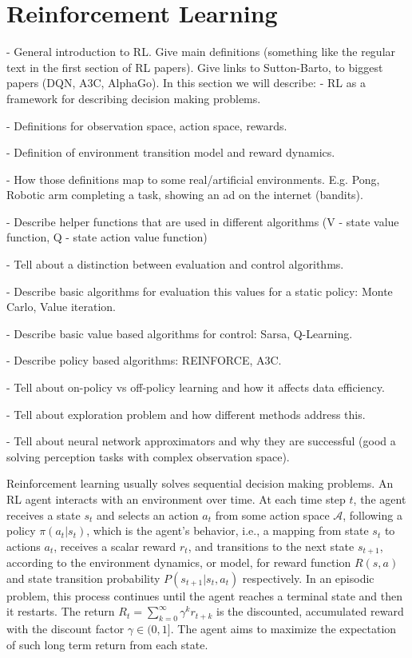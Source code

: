\section{Reinforcement Learning}

- General introduction to RL. Give main definitions (something like the
regular text in the first section of RL papers). Give links to
Sutton-Barto, to biggest papers (DQN, A3C, AlphaGo).
In this section we will describe:
- RL as a framework for describing decision making problems.

- Definitions for observation space, action space, rewards.

- Definition of environment transition model and reward dynamics.

- How those definitions map to some real/artificial environments. E.g. Pong, Robotic arm completing a task,
showing an ad on the internet (bandits).

- Describe helper functions that are used in different algorithms (V - state value function, Q - state action value function)

- Tell about a distinction between evaluation and control algorithms.

- Describe basic algorithms for evaluation this values for a static policy: Monte Carlo, Value iteration.

- Describe basic value based algorithms for control: Sarsa, Q-Learning.

- Describe policy based algorithms: REINFORCE, A3C.

- Tell about on-policy vs off-policy learning and how it affects data efficiency.

- Tell about exploration problem and how different methods address this.

- Tell about neural network approximators and why they are successful (good a solving perception tasks with complex
observation space).


Reinforcement learning usually solves sequential decision making problems. An RL agent interacts with an environment over time. At each time step $t$, the agent receives a state $s_t$ and selects an action $a_t$ from some action space $\mathcal{A}$, following a policy $\pi(a_t|s_t)$, which is the agent's behavior, i.e., a mapping from state $s_t$ to actions $a_t$, receives a scalar reward $r_t$, and transitions to the next state $s_{t+1}$, according to the environment dynamics, or model, for reward function $R(s,a)$ and state transition probability $P(s_{t+1}|s_t, a_t)$ respectively. In an episodic problem, this process continues until the agent reaches a terminal state and then it restarts. The return $R_t = \sum_{k=0}^{\infty} \gamma^k r_{t+k}$ is the discounted, accumulated reward with the discount factor $\gamma \in (0,1]$. The agent aims to maximize the expectation of such long term return from each state.

